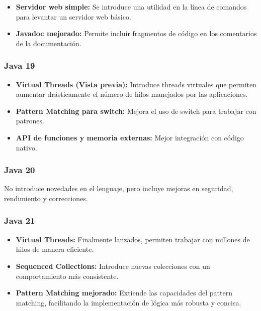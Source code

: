 \begin{center}
\begin{itemize}
		\item \textbf{Servidor web simple:} Se introduce una utilidad en la línea de comandos
		      para levantar un servidor web básico.

		\item \textbf{Javadoc mejorado:} Permite incluir fragmentos de código en los comentarios
		      de la documentación.

	\end{itemize}

	\subsubsection{Java 19}
	\begin{itemize}
		\item \textbf{Virtual Threads (Vista previa):} Introduce threads virtuales que permiten aumentar
		      drásticamente el número de hilos manejados por las aplicaciones.

		\item \textbf{Pattern Matching para switch:} Mejora el uso de switch para trabajar con patrones.

		\item \textbf{API de funciones y memoria externas:} Mejor integración con código nativo.

	\end{itemize}

	\subsubsection{Java 20}
	No introduce novedades en el lenguaje, pero incluye mejoras en seguridad, rendimiento y correcciones.
	\subsubsection{Java 21}
	\begin{itemize}
		\item \textbf{Virtual Threads:} Finalmente lanzados, permiten trabajar con millones de hilos de
		      manera eficiente.

		\item \textbf{Sequenced Collections:} Introduce nuevas colecciones con un comportamiento más consistente.

		\item \textbf{Pattern Matching mejorado:} Extiende las capacidades del pattern matching,
		      facilitando la implementación de lógica más robusta y concisa.


\end{itemize}
\end{center}

